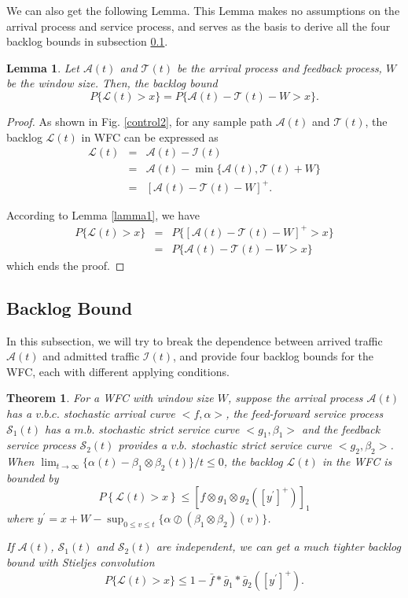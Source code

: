 \documentclass[12pt]{article}
\newtheorem{theorem}{Theorem}
\newtheorem{lemma}{Lemma}
\newtheorem{proof}{Proof}
\begin{document}
We can also get the following Lemma. This Lemma makes no assumptions on the arrival process and service process, and serves as the basis to derive all the four backlog bounds in subsection \ref{backlog}.
\begin{lemma}\label{lama2}
Let $\mathcal{A}(t)$ and $\mathcal{T}(t)$ be the arrival process and feedback process, $W$ be the window size. Then, the backlog bound
$$P\{\mathcal{L}(t)> x\}=P\{\mathcal{A}(t)-\mathcal{T}(t)-W> x\}.$$
\end{lemma}
\begin{proof}
As shown in Fig. \ref{control2}, for any sample path $\mathcal{A}(t)$ and $\mathcal{T}(t)$, the backlog $\mathcal{L}(t)$ in WFC can be expressed as
\begin{eqnarray}
  \mathcal{L}(t)&=&\mathcal{A}(t)-\mathcal{I}(t)\nonumber\\
      &=&\mathcal{A}(t)-\min\{\mathcal{A}(t),\mathcal{T}(t)+W\}\nonumber\\
      &=&[\mathcal{A}(t)-\mathcal{T}(t)-W]^+.\nonumber
\end{eqnarray}

According to Lemma \ref{lamma1}, we have
\begin{eqnarray*}
  P\{\mathcal{L}(t)>x\}&=&P\{[\mathcal{A}(t)-\mathcal{T}(t)-W]^+>x\}\\
  &=&P\{\mathcal{A}(t)-\mathcal{T}(t)-W>x\}
\end{eqnarray*}
which ends the proof.
\end{proof}

\subsection{Backlog Bound}\label{backlog}
In this subsection, we will try to break the dependence between arrived traffic $\mathcal{A}(t)$ and admitted traffic $\mathcal{I}(t)$, and provide four backlog bounds for the WFC, each with different applying conditions.
\begin{theorem}\label{theorem1}
For a WFC with window size $W$, suppose the arrival process $\mathcal{A}(t)$ has a $v.b.c.$ stochastic arrival curve $<f,\alpha>$, the feed-forward service process $\mathcal{S}_1(t)$ has a $m.b.$ stochastic strict service curve $<g_1,\beta_1>$ and the feedback service process $\mathcal{S}_2(t)$ provides a $v.b.$ stochastic strict service curve $<g_2,\beta_2>$. When $\lim_{t\to\infty}\{\alpha(t)-\beta_1\otimes\beta_2(t)\}/t\leq 0$, the backlog $\mathcal{L}(t)$ in the WFC is bounded by
\begin{equation}\label{eqn1}
P\left\{\mathcal{L}(t)>x\right\}\leq [f\otimes g_1\otimes g_2([y^\prime]^+)]_1
\end{equation}
where $y^\prime=x+W-\sup_{0\leq v\leq t}\{\alpha\oslash(\beta_1\otimes\beta_2)(v)\}$.

If $\mathcal{A}(t)$, $\mathcal{S}_1(t)$ and $\mathcal{S}_2(t)$ are independent, we can get a much tighter backlog bound with Stieljes convolution
\begin{equation}\label{eqn2}
P\{\mathcal{L}(t)>x\}\leq 1-\bar{f}\ast\bar{g}_1\ast\bar{g}_2([y^\prime]^+).
\end{equation}
\end{theorem}
\end{document}
